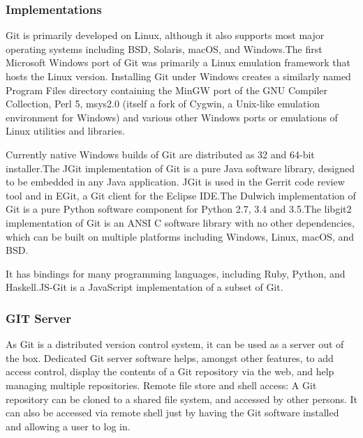 \documentclass[a4paper,12pt]{article}
\begin{document}
\subsubsection{Implementations}\vspace{2mm}
Git is primarily developed on Linux, although it also supports most major operating systems including BSD, Solaris, macOS, and Windows.The first Microsoft Windows port of Git was primarily a Linux emulation framework that hosts the Linux version. Installing Git under Windows creates a similarly named Program Files directory containing the MinGW port of the GNU Compiler Collection, Perl 5, msys2.0 (itself a fork of Cygwin, a Unix-like emulation environment for Windows) and various other Windows ports or emulations of Linux utilities and libraries.
\par\vspace{2mm} Currently native Windows builds of Git are distributed as 32 and 64-bit installer.The JGit implementation of Git is a pure Java software library, designed to be embedded in any Java application. JGit is used in the Gerrit code review tool and in EGit, a Git client for the Eclipse IDE.The Dulwich implementation of Git is a pure Python software component for Python 2.7, 3.4 and 3.5.The libgit2 implementation of Git is an ANSI C software library with no other dependencies, which can be built on multiple platforms including Windows, Linux, macOS, and BSD.
\par\vspace{2mm}It has bindings for many programming languages, including Ruby, Python, and Haskell.JS-Git is a JavaScript implementation of a subset of Git.\vspace{2mm}

\subsubsection{GIT Server}\vspace{2mm}
As Git is a distributed version control system, it can be used as a server out of the box. Dedicated Git server software helps, amongst other features, to add access control, display the contents of a Git repository via the web, and help managing multiple repositories. Remote file store and shell access: A Git repository can be cloned to a shared file system, and accessed by other persons. It can also be accessed via remote shell just by having the Git software installed and allowing a user to log in.
\newpage
\end{document}
